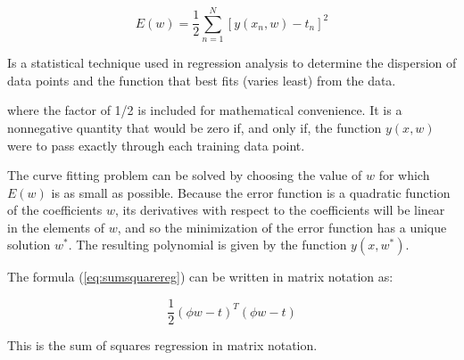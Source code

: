 \begin{Equation}[H]
	\centering
	\begin{equation} \label{eq:sumsquarereg}
		E(w)=\frac{1}{2} \sum_{n=1}^{N} [y(x_n,w)-t_n]^2
	\end{equation}
	\caption[Sum of squares regression.]{Is a statistical technique used in regression analysis to determine the dispersion of data points and the function that best fits (varies least) from the data.}
\end{Equation}

\noindent where the factor of 1/2 is included for mathematical convenience. It is a nonnegative quantity that would be zero if, and only if, the function $y(x, w)$ were to pass exactly through each training data point.

\noindent The curve fitting problem can be solved by choosing the value of $w$ for which $E(w)$ is as small as possible. Because the error function is a quadratic function of the coefficients $w$, its derivatives with respect to the coefficients will be linear in the elements of $w$, and so the minimization of the error function has a unique solution $w^*$. The resulting polynomial is given by the function $y(x, w^*)$.




\noindent The formula (\ref{eq:sumsquarereg}) can be written in matrix notation as:

\begin{Equation}[H]
	\centering
	\begin{equation} \label{eq:sumsquareregvec}
	\frac{1}{2} (\phi w - t)^T (\phi w - t)
	\end{equation}
	\caption[Sum of squares regression in matrix notation.]{This is the sum of squares regression in matrix notation.}
\end{Equation}

